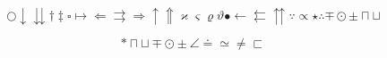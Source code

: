 
\begin{equation}
\bigcirc\downarrow\downdownarrows\dagger\ddagger\square\mapsto\Leftarrow\rightrightarrows\Rightarrow\uparrow\Uparrow\varkappa\varsigma\varrho\vartheta\bullet\leftarrow\leftleftarrows\upuparrows\because\propto\star\therefore\mp\odot\pm\sqcap\sqcup
\end{equation}

\begin{equation}
\ast\sqcap\sqcup\mp\odot\pm\angle\doteq\simeq\ne\sqsubset
\end{equation}
